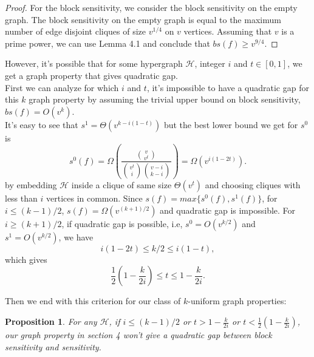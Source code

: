\documentclass[psamsfonts]{amsart}
\newtheorem{prop}[theorem]{Proposition}
\theoremstyle{definition}
\theoremstyle{remark}
\numberwithin{equation}{section}
\begin{document}
	\begin{proof}
		For the block sensitivity, we consider the block sensitivity on the empty graph. The block sensitivity on the empty graph is equal to the maximum number of edge disjoint cliques of size $v^{1/4}$ on $v$ vertices. Assuming that $v$ is a prime power, we can use Lemma 4.1 and conclude that $bs(f) \geq v^{9/4}$.
	\end{proof}
		 However, it's possible that for some hypergraph $\mathcal{H}$, integer $i$ and $t \in [0,1]$, we get a graph property that gives quadratic gap.\\ 
 \indent First we can analyze for which $i$ and $t$, it's impossible to have a quadratic gap for this $k$ graph property by assuming the trivial upper bound on block sensitivity, $bs(f) = O(v^k)$.\\
	\indent It's easy to see that $s^1 = \Theta(v^{k-i(1-t)})$ but the best lower bound we get for $s^0$ is 
	\begin{equation}
		s^0(f) = \Omega(\frac{{v \choose{v^t}}}{{v^t \choose{i}}{v-i \choose{k-i}}}) = \Omega(v^{i(1-2t)}). \nonumber
	\end{equation}
		by embedding $\mathcal{H}$ inside a clique of same size $\Theta(v^t)$ and choosing cliques with less than $i$ vertices in common. Since $s(f) = max \{ s^0(f), s^1(f) \}$, for $i \leq (k-1)/2$, $s(f) = \Omega(v^{(k+1)/2})$ and quadratic gap is impossible. For $i \geq (k+1)/2$, if quadratic gap is possible, i.e, $s^0 = O(v^{k/2})$ and $s^1 = O(v^{k/2})$, we have
		\begin{equation}
			i(1-2t) \leq k/2 \leq i(1-t),	\nonumber
		\end{equation}
		which gives
		\begin{equation}
			\frac{1}{2} (1- \frac{k}{2i}) \leq t \leq 1- \frac{k}{2i}. \nonumber
		\end{equation}
		
		Then we end with this criterion for our class of $k$-uniform graph properties:
		\begin{prop}
			For any $\mathcal{H}$, if $i \leq (k-1)/2$ or $t > 1- \frac{k}{2i}$ or $t < \frac{1}{2} (1- \frac{k}{2i})$, our graph property in section 4 won't give a quadratic gap between block sensitivity and sensitivity.
		\end{prop}
	
\end{document}
